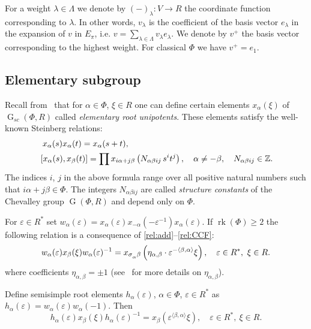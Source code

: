 \documentclass[12pt]{amsart}
\numberwithin{equation}{section}
\theoremstyle{definition}
\DeclareMathOperator{\G}{G}
\DeclareMathOperator{\rk}{rk}
\def\ssub#1{\mathchoice
   {_{\lower2pt\hbox{$\scriptstyle #1$}}}
   {_{\lower2pt\hbox{$\scriptstyle #1$}}}
   {_{\lower1.5pt\hbox{$\scriptscriptstyle #1$}}}
   {_{\!\lower1.5pt\hbox{$\scriptscriptstyle #1$}}}}
\begin{document}
For a weight $\lambda\in \Lambda$ we denote by $(-)_\lambda\colon V\to R$ the coordinate function corresponding to $\lambda$.
In other words,  $v_\lambda$ is the coefficient of the basis vector $e_\lambda$ in the expansion of $v$ in $E_\pi$, i.e. $v=\sum_{\lambda\in \Lambda} v_\lambda e_\lambda$.
We denote by $v^+$ the basis vector corresponding to the highest weight.
For classical $\Phi$ we have $v^+=e_1$.

\subsection{Elementary subgroup}\label{sec:elementary}
Recall from~\cite{St78, VP} that for $\alpha\in \Phi$, $\xi\in R$ one can define certain elements $x_{\alpha}(\xi)$ of $\G_{sc}(\Phi, R)$ called {\it elementary root unipotents}.
These elements satisfy the well-known Steinberg relations:
\begin{align}
& \phantom{\left[{}\vphantom{x_\beta(t)}\right.}
x_\alpha(s) x_\alpha(t) = x_\alpha(s+t), \label{rel:add}\\
& \left[x_\alpha(s),  x_\beta(t)\right] = \prod x_{i\alpha + j\beta}\left(N_{\alpha\beta ij}\, s^i t^j\right),\quad \alpha\neq-\beta, \quad N_{\alpha\beta ij}\in\mathbb{Z}. \label{rel:CCF}
\end{align} 
The indices $i$, $j$ in the above formula range over all positive natural numbers such that $i\alpha + j\beta\in\Phi$.
The integers $N_{\alpha\beta ij}$ are called {\it structure constants} of the Chevalley group $\G(\Phi,R)$ and depend only on $\Phi$.

For $\varepsilon\in R^*$ set $w_\alpha(\varepsilon) = x_\alpha(\varepsilon) x_{-\alpha}(-\varepsilon^{-1}) x_{\alpha}(\varepsilon).$
If $\rk(\Phi)\geqslant 2$ the following relation is a consequence of \ref{rel:add}--\ref{rel:CCF}:
\begin{equation}\label{rel:R3}
w_\alpha(\varepsilon) x_{\beta}(\xi) w_\alpha(\varepsilon)^{-1} =
x_{\sigma\ssub{\alpha}\beta} \left(\eta_{\alpha, \beta}\cdot\varepsilon^{-\langle\beta,\alpha \rangle}\xi\right),\quad \varepsilon\in R^*,\ \xi\in R.
\end{equation}
where coefficients $\eta_{\alpha, \beta} = \pm 1$ (see~\cite[\S13]{VP} for more details on $\eta_{\alpha, \beta}$).

Define semisimple root elements $h_\alpha(\varepsilon)$, $\alpha\in\Phi$, $\varepsilon\in R^*$ as $h_\alpha(\varepsilon)=w_\alpha(\varepsilon)w_\alpha(-1)$. Then
\begin{equation}\label{rel:R6}
h_\alpha(\varepsilon)x_\beta(\xi)h_\alpha(\varepsilon)^{-1} = x_\beta\left(\varepsilon^{\langle\beta,\alpha\rangle}\xi\right),\quad \varepsilon\in R^*,\ \xi\in R.
\end{equation}
\end{document}
